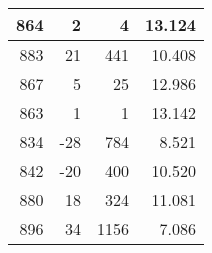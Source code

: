 \begin{longtable}{|r|r|r|r|}
	864                                                                                             & 2                                                 & 4                                                    & 13.124                                                                                         \\ \hline
	883                                                                                             & 21                                                & 441                                                  & 10.408                                                                                         \\ \hline
	867                                                                                             & 5                                                 & 25                                                   & 12.986                                                                                         \\ \hline
	863                                                                                             & 1                                                 & 1                                                    & 13.142                                                                                         \\ \hline
	834                                                                                             & -28                                               & 784                                                  & 8.521                                                                                          \\ \hline
	842                                                                                             & -20                                               & 400                                                  & 10.520                                                                                         \\ \hline
	880                                                                                             & 18                                                & 324                                                  & 11.081                                                                                         \\ \hline
	896                                                                                             & 34                                                & 1156                                                 & 7.086                                                                                          \\ \hline

\end{longtable}
